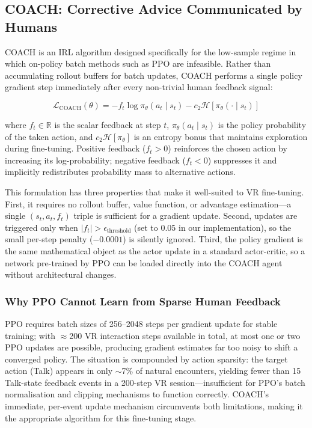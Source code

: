 \documentclass[../report.tex]{subfiles}
\begin{document}
    \subsection{COACH: Corrective Advice Communicated by Humans}
    \label{sec:background:coach}

    COACH \citep{Lin2020} is an IRL algorithm designed specifically for the low-sample regime in which on-policy batch methods such as PPO are infeasible. Rather than accumulating rollout buffers for batch updates, COACH performs a single policy gradient step immediately after every non-trivial human feedback signal:

    \begin{equation}
        \mathcal{L}_{\text{COACH}}(\theta) = -f_t \log \pi_\theta(a_t \mid s_t) - c_2 \mathcal{H}[\pi_\theta(\cdot \mid s_t)]
        \label{eq:coach}
    \end{equation}

    where $f_t \in \mathbb{R}$ is the scalar feedback at step $t$, $\pi_\theta(a_t \mid s_t)$ is the policy probability of the taken action, and $c_2 \mathcal{H}[\pi_\theta]$ is an entropy bonus that maintains exploration during fine-tuning. Positive feedback ($f_t > 0$) reinforces the chosen action by increasing its log-probability; negative feedback ($f_t < 0$) suppresses it and implicitly redistributes probability mass to alternative actions.

    This formulation has three properties that make it well-suited to VR fine-tuning. First, it requires no rollout buffer, value function, or advantage estimation—a single $(s_t, a_t, f_t)$ triple is sufficient for a gradient update. Second, updates are triggered only when $|f_t| > \epsilon_{\text{threshold}}$ (set to 0.05 in our implementation), so the small per-step penalty ($-0.0001$) is silently ignored. Third, the policy gradient is the same mathematical object as the actor update in a standard actor-critic, so a network pre-trained by PPO can be loaded directly into the COACH agent without architectural changes.

    \subsubsection{Why PPO Cannot Learn from Sparse Human Feedback}

    PPO requires batch sizes of 256--2048 steps per gradient update for stable training; with $\approx$200 VR interaction steps available in total, at most one or two PPO updates are possible, producing gradient estimates far too noisy to shift a converged policy. The situation is compounded by action sparsity: the target action (Talk) appears in only $\sim$7\% of natural encounters, yielding fewer than 15 Talk-state feedback events in a 200-step VR session—insufficient for PPO's batch normalisation and clipping mechanisms to function correctly. COACH's immediate, per-event update mechanism circumvents both limitations, making it the appropriate algorithm for this fine-tuning stage.
\end{document}
